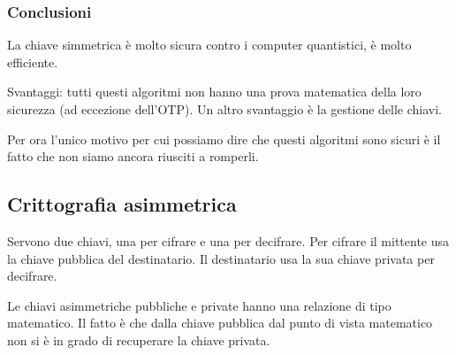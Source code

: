 
\subsubsection{Conclusioni}

La chiave simmetrica è molto sicura contro i computer quantistici, è molto 
efficiente.

Svantaggi: tutti questi algoritmi non hanno una prova matematica della loro 
sicurezza (ad eccezione dell'OTP). Un altro svantaggio è la gestione delle 
chiavi.

Per ora l'unico motivo per cui possiamo dire che questi algoritmi sono sicuri è 
il fatto che non siamo ancora riusciti a romperli.

\subsection{Crittografia asimmetrica}

Servono due chiavi, una per cifrare e una per decifrare. Per cifrare il 
mittente usa la chiave pubblica del destinatario. Il destinatario usa la sua 
chiave privata per decifrare.


Le chiavi asimmetriche pubbliche e private hanno una relazione di tipo 
matematico. Il fatto è che dalla chiave pubblica dal punto di vista matematico 
non si è in grado di recuperare la chiave privata.
